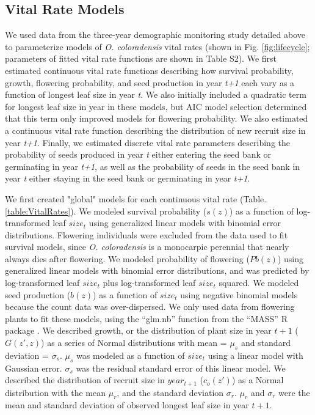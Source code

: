 \documentclass[12pt, letterpaper]{article}
\begin{document}
\subsection{Vital Rate Models}
We used data from the three-year demographic monitoring study detailed above to parameterize models of \textit{O. coloradensis} vital rates (shown in Fig. \ref{fig:lifecycle}; parameters of fitted vital rate functions are shown in Table S2). We first estimated continuous vital rate functions describing how survival probability, growth, flowering probability, and seed production in year \textit{t+1} each vary as a function of longest leaf size in year \textit{t}. We also initially included a quadratic term for longest leaf size in year  in these models, but AIC model selection determined that this term only improved models for flowering probability. We also estimated a continuous vital rate function describing the distribution of new recruit size in year \textit{t+1}. Finally, we estimated discrete vital rate parameters describing the probability of seeds produced in year \textit{t} either entering the seed bank or germinating in year \textit{t+1}, as well as the probability of seeds in the seed bank in year \textit{t} either staying in the seed bank or germinating in year \textit{t+1}.  

We first created "global" models for each continuous vital rate (Table. \ref{table:VitalRates}). 
We modeled survival probability ($s(z)$) as a function of log-transformed leaf $size_t$ using generalized linear models with binomial error distributions. Flowering individuals were excluded from the data used to fit survival models, since \textit{O. coloradensis} is a monocarpic perennial that nearly always dies after flowering.
We modeled probability of flowering ($Pb(z)$) using generalized linear models with binomial error distributions, and was predicted by log-transformed leaf $size_t$ plus log-transformed leaf $size_t$ squared. 
We modeled seed production ($b(z)$) as a function of $size_t$ using negative binomial models because the count data was over-dispersed. We only used data from flowering plants to fit these models, using the “glm.nb” function from the “MASS” R package \cite{Venables2002ModernS}.
We described growth, or the distribution of plant size in year ${t+1}$ ($G(z',z)$) as a series of Normal distributions with mean = $\mu_s$ and standard deviation = $\sigma_s$. $\mu_s$ was modeled as a function of $size_t$ using a linear model with Gaussian error. $\sigma_s$ was the residual standard error of this linear model. 
We described the distribution of recruit size in $year_{t+1}$ ($c_o(z')$) as a Normal distribution with the mean $\mu_r$, and the standard deviation $\sigma_r$. $\mu_r$ and $\sigma_r$ were the mean and standard deviation of observed longest leaf size in year ${t+1}$.
\end{document}
